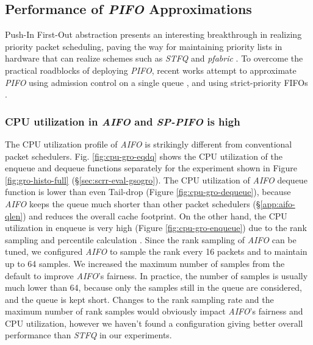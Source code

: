 \subsection{Performance of \textit{PIFO} Approximations}
\label{sec:scrr-eval-pifo}




Push-In First-Out abstraction \cite{pifo} presents an interesting breakthrough in realizing priority packet scheduling, paving the way for maintaining priority lists in hardware that can realize schemes such as \textit{STFQ} \cite{stfq} and \textit{pfabric} \cite{pfabric}. To overcome the practical roadblocks of deploying \textit{PIFO}, recent works attempt to approximate \textit{PIFO} using admission control on a single queue \cite{aifo}, and using strict-priority FIFOs \cite{sppifo}.

\subsubsection{CPU utilization in \textit{AIFO} and \textit{SP-PIFO} is high}
\label{app:pifo-cpu}

The CPU utilization profile of \textit{AIFO} is strikingly different from
conventional packet schedulers. Fig. \ref{fig:cpu-gro-eqdq} shows the CPU
utilization of the enqueue and dequeue functions separately for the
experiment shown in Figure \ref{fig:gro-histo-full}
(\S\ref{sec:scrr-eval-gsogro}). The CPU utilization of \textit{AIFO} dequeue
function is lower than even Tail-drop (Figure \ref{fig:cpu-gro-dequeue}),
because \textit{AIFO} keeps the queue much shorter than other packet schedulers
(\S\ref{app:aifo-qlen}) and reduces the overall cache footprint. On the
other hand, the CPU utilization in enqueue is very high (Figure 
\ref{fig:cpu-gro-enqueue}) due to the rank sampling and percentile
calculation \cite{aifo}. Since the rank sampling of \textit{AIFO} can be tuned, we
configured \textit{AIFO} to sample the rank every 16 packets and to maintain up to
64 samples. We increased the maximum number of samples from the
default \cite{aifo} to improve \textit{AIFO}'s fairness. In practice, the number
of samples is usually much lower than 64, because only the samples
still in the queue are considered, and the queue is kept
short. Changes to the rank sampling rate and the maximum number of
rank samples would obviously impact \textit{AIFO}'s fairness and CPU utilization,
however we haven't found a configuration giving better
overall performance than \textit{STFQ} in our experiments.

